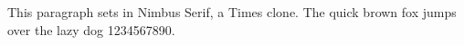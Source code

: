 \documentclass{article}
\begin{document}
This paragraph sets in Nimbus Serif, a Times clone.
The quick brown fox jumps over the lazy dog 1234567890.
\end{document}
